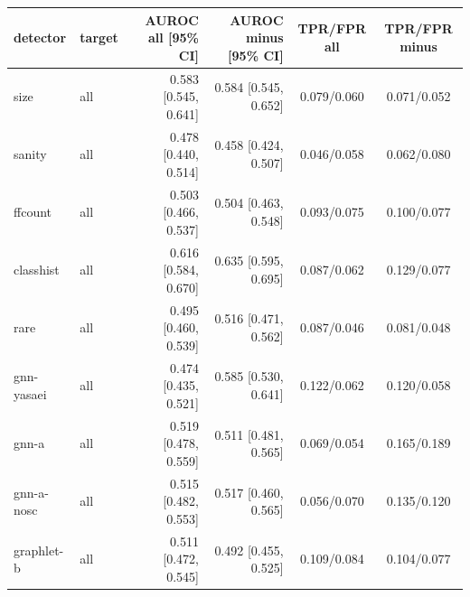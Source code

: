 \begin{tabular}{@{}llrrcc@{}}
\toprule
detector & target & AUROC all [95\% CI] & AUROC minus [95\% CI] & TPR/FPR all & TPR/FPR minus \\
\midrule
size & all & 0.583 [0.545, 0.641] & 0.584 [0.545, 0.652] & 0.079/0.060 & 0.071/0.052 \\
sanity & all & 0.478 [0.440, 0.514] & 0.458 [0.424, 0.507] & 0.046/0.058 & 0.062/0.080 \\
ffcount & all & 0.503 [0.466, 0.537] & 0.504 [0.463, 0.548] & 0.093/0.075 & 0.100/0.077 \\
classhist & all & 0.616 [0.584, 0.670] & 0.635 [0.595, 0.695] & 0.087/0.062 & 0.129/0.077 \\
rare & all & 0.495 [0.460, 0.539] & 0.516 [0.471, 0.562] & 0.087/0.046 & 0.081/0.048 \\
gnn-yasaei & all & 0.474 [0.435, 0.521] & 0.585 [0.530, 0.641] & 0.122/0.062 & 0.120/0.058 \\
gnn-a & all & 0.519 [0.478, 0.559] & 0.511 [0.481, 0.565] & 0.069/0.054 & 0.165/0.189 \\
gnn-a-nosc & all & 0.515 [0.482, 0.553] & 0.517 [0.460, 0.565] & 0.056/0.070 & 0.135/0.120 \\
graphlet-b & all & 0.511 [0.472, 0.545] & 0.492 [0.455, 0.525] & 0.109/0.084 & 0.104/0.077 \\
\bottomrule
\end{tabular}
